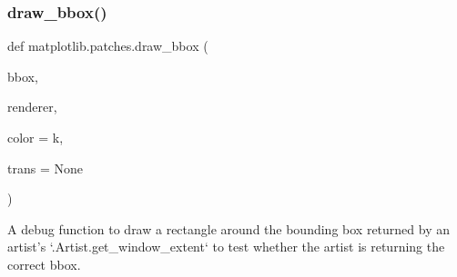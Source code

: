 \subsubsection{\texorpdfstring{draw\+\_\+bbox()}{draw\_bbox()}}
{\footnotesize\ttfamily def matplotlib.\+patches.\+draw\+\_\+bbox (\begin{DoxyParamCaption}\item[{}]{bbox,  }\item[{}]{renderer,  }\item[{}]{color = {\ttfamily \textquotesingle{}k\textquotesingle{}},  }\item[{}]{trans = {\ttfamily None} }\end{DoxyParamCaption})}

\begin{DoxyVerb}A debug function to draw a rectangle around the bounding
box returned by an artist's `.Artist.get_window_extent`
to test whether the artist is returning the correct bbox.
\end{DoxyVerb}
 